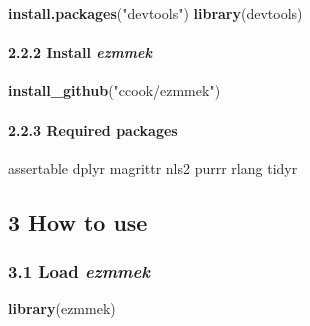 \documentclass[
]{article}
\newenvironment{Shaded}{\begin{snugshade}}{\end{snugshade}}
\newcommand{\KeywordTok}[1]{\textcolor[rgb]{0.13,0.29,0.53}{\textbf{#1}}}
\newcommand{\NormalTok}[1]{#1}
\newcommand{\StringTok}[1]{\textcolor[rgb]{0.31,0.60,0.02}{#1}}
\begin{document}
\begin{Shaded}
\begin{Highlighting}[]
\KeywordTok{install.packages}\NormalTok{(}\StringTok{"devtools"}\NormalTok{)}
\KeywordTok{library}\NormalTok{(devtools)}
\end{Highlighting}
\end{Shaded}

\hypertarget{install-ezmmek}{%
\paragraph{\texorpdfstring{2.2.2 Install
\emph{ezmmek}}{2.2.2 Install ezmmek}}\label{install-ezmmek}}

\begin{Shaded}
\begin{Highlighting}[]
\KeywordTok{install\_github}\NormalTok{(}\StringTok{"ccook/ezmmek"}\NormalTok{)}
\end{Highlighting}
\end{Shaded}

\hypertarget{required-packages}{%
\paragraph{2.2.3 Required packages}\label{required-packages}}

\begin{Shaded}
\begin{Highlighting}[]
\NormalTok{assertable}
\NormalTok{dplyr}
\NormalTok{magrittr}
\NormalTok{nls2}
\NormalTok{purrr}
\NormalTok{rlang}
\NormalTok{tidyr}
\end{Highlighting}
\end{Shaded}

\hypertarget{how-to-use}{%
\subsection{3 How to use}\label{how-to-use}}

\hypertarget{load-ezmmek}{%
\subsubsection{\texorpdfstring{3.1 Load
\emph{ezmmek}}{3.1 Load ezmmek}}\label{load-ezmmek}}

\begin{Shaded}
\begin{Highlighting}[]
\KeywordTok{library}\NormalTok{(ezmmek)}
\end{Highlighting}
\end{Shaded}
\end{document}
